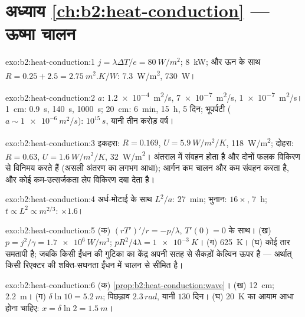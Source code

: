 \section*{अध्याय \ref{ch:b2:heat-conduction} --- ऊष्मा चालन}

\begin{solution}{exo:b2:heat-conduction:1}
$j = \lambda\Delta T/e = \qty{80}{W/m^2}$; \qty{8}{kW}; और ऊन के साथ $R = 0.25 + 2.5 =
\qty{2.75}{m^2.K/W}$: \qty{7.3}{W/m^2}, \qty{730}{W}।
\end{solution}

\begin{solution}{exo:b2:heat-conduction:2}
$a$: \qty{1.2e-4}{m^2/s}, \qty{7e-7}{m^2/s}, \qty{1e-7}{m^2/s}। \qty{1}{cm}:
\qty{0.9}{s}, \qty{140}{s}, \qty{1000}{s}; \qty{20}{cm}: \qty{6}{min}, \qty{15}{h},
\num{5} दिन; भूपर्पटी ($a \sim \qty{1e-6}{m^2/s}$): $10^{15}\,\unit{s}$, यानी तीन
करोड़ वर्ष।
\end{solution}

\begin{solution}{exo:b2:heat-conduction:3}
इकहरा: $R = 0.169$, $U = \qty{5.9}{W/m^2/K}$, \qty{118}{W/m^2}; दोहरा: $R =
0.63$, $U = \qty{1.6}{W/m^2/K}$, \qty{32}{W/m^2}। अंतराल में संवहन होता है और दोनों फलक
विकिरण से विनिमय करते हैं (असली अंतरण का लगभग आधा); आर्गन कम
चालन और कम संवहन करता है, और कोई कम-उत्सर्जकता लेप विकिरण
दबा देता है।
\end{solution}

\begin{solution}{exo:b2:heat-conduction:4}
अर्ध-मोटाई के साथ $L^2/a$: \qty{27}{min}; भुनान: $16\times$, \qty{7}{h};
$t \propto L^2 \propto m^{2/3}$: $\times 1.6$।
\end{solution}

\begin{solution}{exo:b2:heat-conduction:5}
(क) $(rT')'/r = -p/\lambda$, $T'(0) = 0$ के साथ। (ख) $p = j^2/\gamma = \qty{1.7e6}{W/m^3}$;
$pR^2/4\lambda = \qty{1e-3}{K}$। (ग) \qty{625}{K}। (घ) कोई तार समतापी है; जबकि किसी ईंधन
की गुटिका का केंद्र अपनी सतह से सैकड़ों केल्विन ऊपर है --- अर्थात् किसी रिएक्टर
की शक्ति-सघनता ईंधन में चालन से सीमित है।
\end{solution}

\begin{solution}{exo:b2:heat-conduction:6}
(क) \cref{prop:b2:heat-conduction:wave}। (ख) \qty{12}{cm}; \qty{2.2}{m}। (ग)
$\delta\ln 10 = \qty{5.2}{m}$; पिछड़ाव $2.3\,\unit{rad}$, यानी $130$ दिन। (घ)
\qty{20}{K} का आयाम आधा होना चाहिए: $x = \delta\ln 2 = \qty{1.5}{m}$।
\end{solution}

